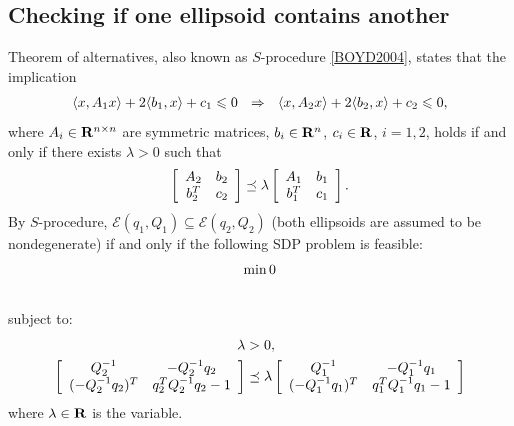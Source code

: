 \documentclass[letterpaper,10pt,english]{sphinxmanual}
\begin{document}
\subsection{Checking if one ellipsoid contains another}
\label{main_source:checking-if-one-ellipsoid-contains-another}
Theorem of alternatives, also known as $S$-procedure {\hyperref[main_source:boyd2004]{{[}BOYD2004{]}}},
states that the implication
\begin{gather}
\begin{split}\langle x, A_1x\rangle + 2\langle b_1,x\rangle + c_1 \leqslant0
~~ \Rightarrow ~~
\langle x, A_2x\rangle + 2\langle b_2,x\rangle + c_2 \leqslant0,\end{split}\notag
\end{gather}
where $A_i\in{\bf R}^{n\times n}$ are symmetric matrices,
$b_i\in{\bf R}^n$, $c_i\in{\bf R}$, $i=1,2$, holds if
and only if there exists $\lambda>0$ such that
\begin{gather}
\begin{split}\left[\begin{array}{cc}
A_2 & b_2\\
b_2^T & c_2\end{array}\right]
\preceq
\lambda\left[\begin{array}{cc}
A_1 & b_1\\
b_1^T & c_1\end{array}\right].\end{split}\notag
\end{gather}
By $S$-procedure,
${\mathcal E}(q_1,Q_1)\subseteq{\mathcal E}(q_2,Q_2)$ (both
ellipsoids are assumed to be nondegenerate) if and only if the following
SDP problem is feasible:
\begin{gather}
\begin{split}\min 0\end{split}\notag\\\begin{split}\end{split}\notag
\end{gather}
subject to:
\begin{gather}
\begin{split}\begin{aligned}
\lambda & >  0, \\
\left[\begin{array}{cc}
Q_2^{-1} & -Q_2^{-1}q_2\\
(-Q_2^{-1}q_2)^T & q_2^TQ_2^{-1}q_2-1\end{array}\right]
& \preceq
\lambda \left[\begin{array}{cc}
Q_1^{-1} & -Q_1^{-1}q_1\\
(-Q_1^{-1}q_1)^T & q_1^TQ_1^{-1}q_1-1\end{array}\right]\end{aligned}\end{split}\notag
\end{gather}
where $\lambda\in{\bf R}$ is the variable.
\end{document}
